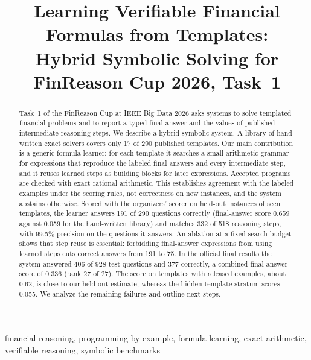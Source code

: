 \documentclass[conference]{IEEEtran}
\begin{document}
\title{Learning Verifiable Financial Formulas from Templates:\\
Hybrid Symbolic Solving for FinReason Cup 2026, Task~1}

\author{
}

\maketitle

\begin{abstract}
Task~1 of the FinReason Cup at IEEE Big Data 2026 asks systems to solve
templated financial problems and to report a typed final answer and the values
of published intermediate reasoning steps. We describe a hybrid symbolic system.
A library of hand-written exact solvers covers only 17 of 290 published
templates. Our main contribution is a generic formula learner: for each template
it searches a small arithmetic grammar for expressions that reproduce the
labeled final answers and every intermediate step, and it reuses learned steps
as building blocks for later expressions. Accepted programs are checked with
exact rational arithmetic. This establishes agreement with the labeled examples
under the scoring rules, not correctness on new instances, and the system
abstains otherwise. Scored with the organizers' scorer on held-out instances of
seen templates, the learner answers 191 of 290 questions correctly
(final-answer score 0.659 against 0.059 for the hand-written library) and
matches 332 of 518 reasoning steps, with 99.5\% precision on the questions it
answers. An ablation at a fixed search budget shows that step reuse is
essential: forbidding final-answer expressions from using learned steps cuts
correct answers from 191 to 75. In the official final results the system
answered 406 of 928 test questions and 377 correctly, a combined final-answer
score of 0.336 (rank 27 of 27). The score on templates with released examples,
about 0.62, is close to our held-out estimate, whereas the hidden-template
stratum scores 0.055. We analyze the remaining failures and outline next steps.
\end{abstract}

\begin{IEEEkeywords}
financial reasoning, programming by example, formula learning, exact
arithmetic, verifiable reasoning, symbolic benchmarks
\end{IEEEkeywords}
\end{document}
